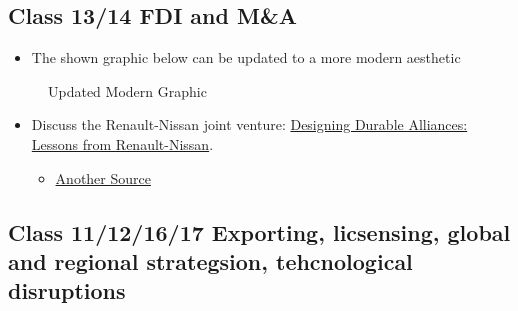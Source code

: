 \documentclass[
  11pt,
]{article}
\providecommand{\tightlist}{%
  \setlength{\itemsep}{0pt}\setlength{\parskip}{0pt}}
\begin{document}
\subsection{Class 13/14 FDI and M\&A}\label{class13-14}

\begin{itemize}
\tightlist
\item
  The shown graphic below can be updated to a more modern aesthetic
\end{itemize}

\begin{figure}


\caption{\label{fig-2}Updated Modern Graphic}

\end{figure}%

\begin{itemize}
\tightlist
\item
  Discuss the Renault-Nissan joint venture:
  \href{https://knowledge.insead.edu/strategy/designing-durable-alliances-lessons-renault-nissan}{Designing
  Durable Alliances: Lessons from Renault-Nissan}.

  \begin{itemize}
  \tightlist
  \item
    \href{https://archive.ph/khRN8\#selection-1399.13-1419.71}{Another
    Source}
  \end{itemize}
\end{itemize}

\subsection{Class 11/12/16/17 Exporting, licsensing, global and regional
strategsion, tehcnological
disruptions}\label{class-11121617-exporting-licsensing-global-and-regional-strategsion-tehcnological-disruptions}
\end{document}
